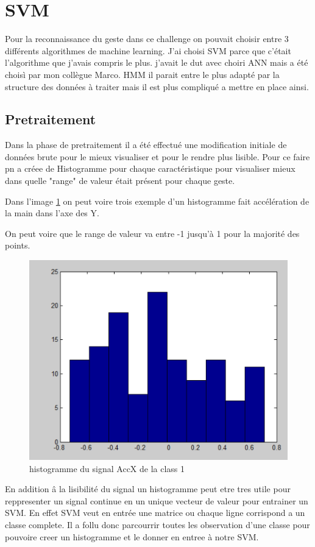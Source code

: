 

\chapter*{SVM}
Pour la reconnaissance du geste dans ce challenge on pouvait choisir entre 3 différents algorithmes de machine learning. J'ai choisi SVM parce que c'était l'algorithme que j'avais compris le plus. j'avait le dut avec choiri ANN mais a été choisì par mon collègue Marco. HMM il parait entre le plus adapté par la structure des données à traiter mais il est plus compliqué a mettre en place ainsi.

\section*{Pretraitement}
Dans la phase de pretraitement il a été effectué une modification initiale de données brute pour le mieux visualiser et pour le rendre plus lisible.
 Pour ce faire pn a créee de Histogramme pour chaque caractéristique pour visualiser mieux dans quelle "range" de valeur était présent pour chaque geste. 

Dans l'image \ref{fig:prehist} on peut voire trois exemple d'un histogramme fait accélération de la main dans l'axe des Y.

On peut voire que le range de valeur va entre -1  jusqu'à 1 pour la majorité des points.
\begin{figure}[h]
  \centering
    \includegraphics[width=0.5\linewidth]{img/pretraitement/hist10.png}
  \caption{histogramme du signal AccX de la class 1}
  \label{fig:prehist}
\end{figure}

En addition â la lisibilité du signal un histogramme peut etre tres utile pour reppresenter un signal continue en un unique vecteur de valeur pour entrainer un SVM. 
En effet SVM veut en entrée une matrice ou chaque ligne corrispond a un classe complete. Il a follu donc parcourrir toutes les observation d'une classe pour pouvoire creer un histogramme et le donner en entree à notre SVM.




